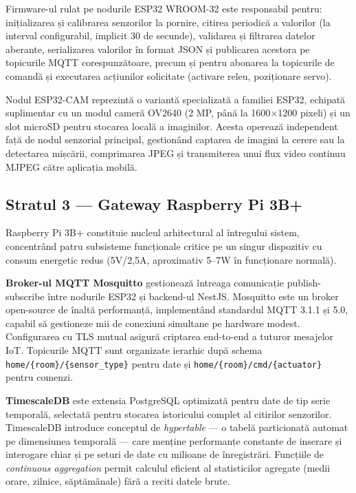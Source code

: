 \documentclass[12pt, twoside, a4paper]{report}
\begin{document}
Firmware-ul rulat pe nodurile ESP32 WROOM-32 este responsabil pentru: inițializarea
și calibrarea senzorilor la pornire, citirea periodică a valorilor (la interval
configurabil, implicit 30 de secunde), validarea și filtrarea datelor aberante,
serializarea valorilor în format JSON și publicarea acestora pe topicurile MQTT
corespunzătoare, precum și pentru abonarea la topicurile de comandă și executarea
acțiunilor solicitate (activare releu, poziționare servo).

Nodul ESP32-CAM reprezintă o variantă specializată a familiei ESP32, echipată
suplimentar cu un modul cameră OV2640 (2 MP, până la 1600$\times$1200 pixeli) și un
slot microSD pentru stocarea locală a imaginilor. Acesta operează independent față de
nodul senzorial principal, gestionând captarea de imagini la cerere sau la detectarea
mișcării, comprimarea JPEG și transmiterea unui flux video continuu MJPEG către
aplicația mobilă.

\subsection{Stratul 3 --- Gateway Raspberry Pi 3B+}

Raspberry Pi 3B+ constituie nucleul arhitectural al întregului sistem, concentrând
patru subsisteme funcționale critice pe un singur dispozitiv cu consum energetic
redus (5V/2,5A, aproximativ 5--7W în funcționare normală).

\textbf{Broker-ul MQTT Mosquitto} gestionează întreaga comunicație publish-subscribe
între nodurile ESP32 și backend-ul NestJS. Mosquitto este un broker open-source de
înaltă performanță, implementând standardul MQTT 3.1.1 și 5.0, capabil să gestioneze
mii de conexiuni simultane pe hardware modest. Configurarea cu TLS mutual asigură
criptarea end-to-end a tuturor mesajelor IoT. Topicurile MQTT sunt organizate ierarhic
după schema \texttt{home/\{room\}/\{sensor\_type\}} pentru date și
\texttt{home/\{room\}/cmd/\{actuator\}} pentru comenzi.

\textbf{TimescaleDB} este extensia PostgreSQL optimizată pentru date de tip serie
temporală, selectată pentru stocarea istoricului complet al citirilor senzorilor.
TimescaleDB introduce conceptul de \textit{hypertable} --- o tabelă particionată
automat pe dimensiunea temporală --- care menține performanțe constante de inserare și
interogare chiar și pe seturi de date cu milioane de înregistrări. Funcțiile de
\textit{continuous aggregation} permit calculul eficient al statisticilor agregate
(medii orare, zilnice, săptămânale) fără a reciti datele brute.
\end{document}
